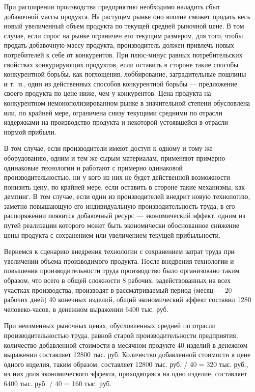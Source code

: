 \documentclass{article}
\begin{document}
При расширении производства предприятию необходимо наладить сбыт добавочной массы продукта. На растущем рынке оно вполне сможет продать весь новый увеличенный объем продукта по текущей средней рыночной цене. В том случае, если спрос на рынке ограничен его текущим размером, для того, чтобы продать добавочную массу продукта, производитель должен привлечь новых потребителей к себе от конкурентов. При плюс-минус равных потребительских свойствах конкурирующих продуктов, если оставить в стороне такие способы конкурентной борьбы, как поглощения, лоббирование, заградительные пошлины и т.~п., один из действенных способов конкурентной борьбы — предложение своего продукта по цене ниже, чем у конкурентов. Цена продукта на конкурентном немонополизированном рынке в значительной степени обусловлена или, по крайней мере, ограничена снизу текущими средними по отрасли издержками на производство продукта и некоторой устоявшейся в отрасли нормой прибыли. 

В том случае, если производители имеют доступ к одному и тому же оборудованию, одним и тем же сырым материалам, применяют примерно одинаковые технологии и работают с примерно одинаковой производительностью, ни у кого из них не будет действенной возможности понизить цену, по крайней мере, если оставить в стороне такие механизмы, как демпинг. В том случае, если один из производителей внедрит новую технологию, заметно повышающую его индивидуальную производительность труда, в его распоряжении появится добавочный ресурс — экономический эффект, одним из путей реализации которого может быть экономически обоснованное снижение цены продукта с сохранением или увеличением текущей прибыльности.

Вернемся к сценарию внедрения технологии с сохранением затрат труда при увеличении объема производимого продукта. После внедрения технологии и повышения производительности труда производство было организовано таким образом, что всего в общей сложности 8 рабочих, задействованных на всех участках производства, производят в рассматриваемый период (месяц — 20 рабочих дней) 40 конечных изделий, общий экономический эффект составил 1280 человеко-часов, в денежном выражении 6400 тыс. руб.

При неизменных рыночных ценах, обусловленных средней по отрасли производительностью труда, равной старой производительности предприятия, количество добавленной стоимости в месячном продукте 40 изделий в денежном выражении составляет 12800 тыс. руб. Количество добавленной стоимости в цене одного изделия, таким образом, составляет 12800 тыс. руб. / 40 = 320 тыс. руб., из них доля экономического эффекта, приходящаяся на одно изделие, составляет 6400 тыс. руб. / 40 = 160 тыс. руб.
\end{document}
